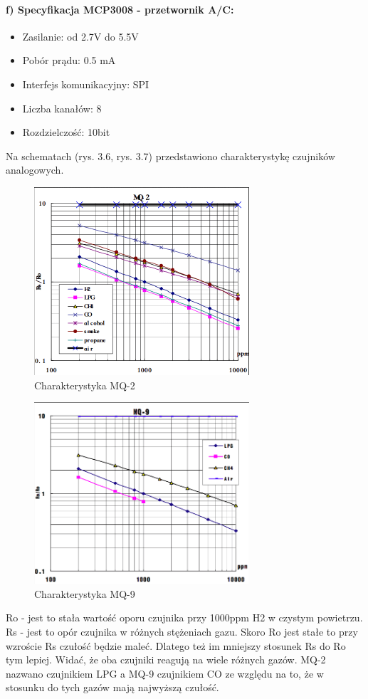 \paragraph{f) Specyfikacja MCP3008 - przetwornik A/C:}
\begin{itemize} 
\item Zasilanie: od 2.7V do 5.5V
\item Pobór prądu: 0.5 mA
\item Interfejs komunikacyjny: SPI
\item Liczba kanałów: 8
\item Rozdzielczość: 10bit
\end{itemize}
Na schematach (rys. 3.6, rys. 3.7) przedstawiono charakterystykę czujników analogowych.
\begin{figure}[ht]
	\centering
	\includegraphics[width=8cm]{MQ2}
	\caption{Charakterystyka MQ-2 \cite{mq2}}
\end{figure}
\begin{figure}[ht]
	\centering
	\includegraphics[width=8cm]{MQ9}
	\caption{Charakterystyka MQ-9 \cite{mq9}}
\end{figure}
Ro - jest to stała wartość oporu czujnika przy 1000ppm H2 w czystym powietrzu.\\
Rs - jest to opór czujnika w różnych stężeniach gazu.
Skoro Ro jest stałe to przy wzroście Rs czułość będzie maleć. Dlatego też im mniejszy stosunek Rs do Ro tym lepiej. Widać, że oba czujniki reagują na wiele różnych gazów. MQ-2 nazwano czujnikiem LPG a MQ-9 czujnikiem CO ze względu na to, że w stosunku do tych gazów mają najwyższą czułość. 

